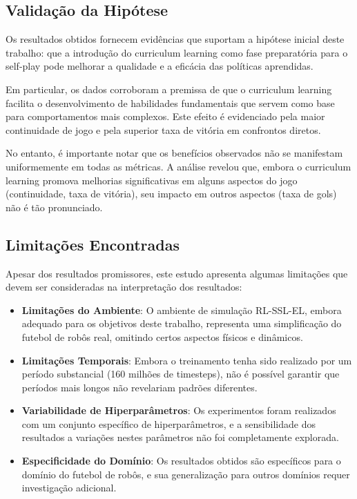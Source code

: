 \subsection{Validação da Hipótese}

Os resultados obtidos fornecem evidências que suportam a hipótese inicial deste trabalho: que a introdução do curriculum learning como fase preparatória para o self-play pode melhorar a qualidade e a eficácia das políticas aprendidas.

Em particular, os dados corroboram a premissa de que o curriculum learning facilita o desenvolvimento de habilidades fundamentais que servem como base para comportamentos mais complexos. Este efeito é evidenciado pela maior continuidade de jogo e pela superior taxa de vitória em confrontos diretos.

No entanto, é importante notar que os benefícios observados não se manifestam uniformemente em todas as métricas. A análise revelou que, embora o curriculum learning promova melhorias significativas em alguns aspectos do jogo (continuidade, taxa de vitória), seu impacto em outros aspectos (taxa de gols) não é tão pronunciado.

\subsection{Limitações Encontradas}

Apesar dos resultados promissores, este estudo apresenta algumas limitações que devem ser consideradas na interpretação dos resultados:

\begin{itemize}
    \item \textbf{Limitações do Ambiente}: O ambiente de simulação RL-SSL-EL, embora adequado para os objetivos deste trabalho, representa uma simplificação do futebol de robôs real, omitindo certos aspectos físicos e dinâmicos.
    
    \item \textbf{Limitações Temporais}: Embora o treinamento tenha sido realizado por um período substancial (160 milhões de timesteps), não é possível garantir que períodos mais longos não revelariam padrões diferentes.
    
    \item \textbf{Variabilidade de Hiperparâmetros}: Os experimentos foram realizados com um conjunto específico de hiperparâmetros, e a sensibilidade dos resultados a variações nestes parâmetros não foi completamente explorada.
    
    \item \textbf{Especificidade do Domínio}: Os resultados obtidos são específicos para o domínio do futebol de robôs, e sua generalização para outros domínios requer investigação adicional.
\end{itemize}

